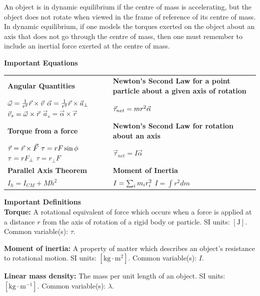 An object is in dynamic equilibrium if the centre of mass is accelerating, but the object does not rotate when viewed in the frame of reference of its centre of mass. In dynamic equilibrium, if one models the torques exerted on the object about an axis that does not go through the centre of mass, then one must remember to include an inertial force exerted at the centre of mass.

\begin{framed}
\textbf{Important Equations}\\
\bigskip\noindent
\begin{tabular}{p{}p{}}
\toprule
 &  \\
\hline
\textbf{Angular Quantities} & \textbf{Newton's Second Law for a point particle about a given axis of rotation} \\
$\vec\omega = \frac{1}{r^2}\vec r \times \vec v\\$ $\vec\alpha = \frac{1}{r^2}\vec r \times \vec a_\perp\\$ $\vec v_s = \vec \omega \times \vec r\nonumber\\$ $\vec a_s = \vec \alpha \times \vec r$ & $\vec \tau_{net} = mr^2 \vec\alpha\\$ \\
\textbf{Torque from a force} & \textbf{Newton's Second Law for rotation about an axis} \\
$\vec\tau = \vec r \times \vec F\\$ $\tau = rF\sin\phi\\$ $\tau=rF_\perp\\$ $\tau=r_\perp F$ & $\vec \tau_{net} = I\vec\alpha$ \\
\textbf{Parallel Axis Theorem} & \textbf{Moment of Inertia} \\
$I_h = I_{CM} + Mh^2$ & $I = \sum_i m_ir_i^2\\$ $I = \int r^2 dm$ \\
\bottomrule
\end{tabular}

\bigskip
\end{framed}

\begin{framed}
\textbf{Important Definitions}\\
\textbf{Torque:} A rotational equivalent of force which occurs when a force is applied at a distance $r$ from the axis of rotation of a rigid body or particle. SI units: $\left[\text{J}\right]$. Common variable(s): $\tau$.

\textbf{Moment of inertia:} A property of matter which describes an object's resistance to rotational motion. SI units: $\left[ \text{kg}\cdot\text{m}^2\right]$. Common variable(s): $I$.

\textbf{Linear mass density:} The mass per unit length of an object. SI units: $\left[\text{kg}\cdot \text{m}^{ -1}\right]$. Common variable(s): $\lambda$.
\end{framed}

